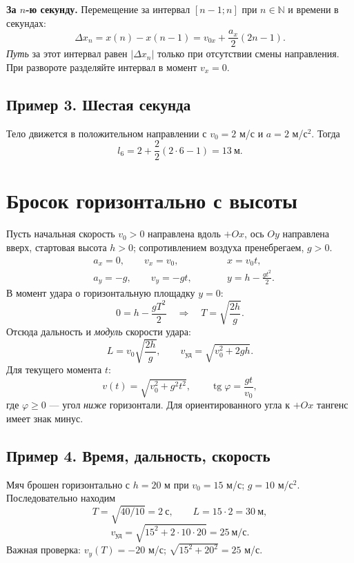 \documentclass[a4paper,12pt]{article}
\begin{document}
\textbf{За $n$-ю секунду.} Перемещение за интервал $[n-1;n]$ при $n\in\mathbb N$ и времени в секундах:
\[
 \Delta x_n=x(n)-x(n-1)=v_{0x}+\frac{a_x}{2}(2n-1).
\]
\textit{Путь} за этот интервал равен $|\Delta x_n|$ только при отсутствии смены направления. При развороте разделяйте интервал в момент $v_x=0$.

\subsection{Пример 3. Шестая секунда}
Тело движется в положительном направлении с $v_0=2$ м/с и $a=2$ м/с$^2$. Тогда
\[
 l_6=2+\frac{2}{2}(2\cdot6-1)=13\ \text{м}.
\]

\section{Бросок горизонтально с высоты}
Пусть начальная скорость $v_0>0$ направлена вдоль $+Ox$, ось $Oy$ направлена вверх, стартовая высота $h>0$; сопротивлением воздуха пренебрегаем, $g>0$.
\[
\begin{aligned}
 &a_x=0,\qquad v_x=v_0,\qquad &&x=v_0t,\\
 &a_y=-g,\qquad v_y=-gt,\qquad &&y=h-\frac{gt^2}{2}.
\end{aligned}
\]
В момент удара о горизонтальную площадку $y=0$:
\[
 0=h-\frac{gT^2}{2}\quad\Longrightarrow\quad
 \boxed{T=\sqrt{\frac{2h}{g}}}.
\]
Отсюда дальность и \textit{модуль} скорости удара:
\[
 \boxed{L=v_0\sqrt{\frac{2h}{g}}},\qquad
 \boxed{v_{\text{уд}}=\sqrt{v_0^2+2gh}}.
\]
Для текущего момента $t$:
\[
 v(t)=\sqrt{v_0^2+g^2t^2},\qquad
 \operatorname{tg}\varphi=\frac{gt}{v_0},
\]
где $\varphi\ge0$ --- угол \textit{ниже} горизонтали. Для ориентированного угла к $+Ox$ тангенс имеет знак минус.

\subsection{Пример 4. Время, дальность, скорость}
Мяч брошен горизонтально с $h=20$ м при $v_0=15$ м/с; $g=10$ м/с$^2$. Последовательно находим
\[
 T=\sqrt{40/10}=2\ \text{с},\qquad L=15\cdot2=30\ \text{м},
\]
\[
 v_{\text{уд}}=\sqrt{15^2+2\cdot10\cdot20}=25\ \text{м/с}.
\]
Важная проверка: $v_y(T)=-20$ м/с; $\sqrt{15^2+20^2}=25$ м/с.
\end{document}
